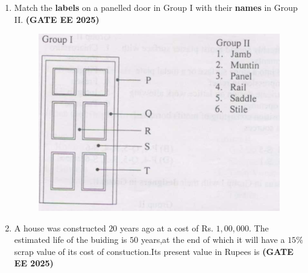 \documentclass[journal,12pt,onecolumn]{IEEEtran}
\theoremstyle{remark}
\begin{document}
\begin{enumerate}
\begin{enumerate}
\end{enumerate}
\item Match the \textbf{labels} on a panelled door in Group I with their \textbf{names} in Group II. \hfill \textbf{(GATE EE 2025)}
\begin{figure}[h]
    \centering
    \includegraphics[width=0.6\linewidth]{figs/fig3.png}
    \caption{}
    \label{fig3}
\end{figure}
\begin{enumerate}
\end{enumerate}
\item A house was constructed $20$ years ago at a cost of Rs. $1,00,000$. The estimated life of the buiding is $50$ years,at the end of which it will have a $15\%$ scrap value of its cost of constuction.Its present value in Rupees is \hfill \textbf{(GATE EE 2025)}
\begin{enumerate}

\end{enumerate}
\end{enumerate}
\end{document}
